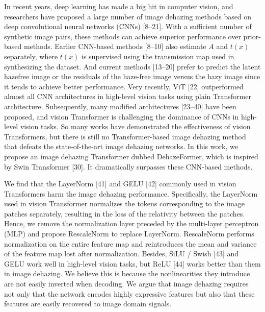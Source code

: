 In recent years, deep learning has made a big hit in computer vision, and researchers have proposed a large number of image dehazing methods based on deep convolutional neural networks (CNNs) [8–21]. With a sufficient number of synthetic image pairs, these methods can achieve superior performance over prior-based methods. Earlier CNN-based methods [8–10] also estimate $A$ and $t(x)$ separately, where $t(x)$ is supervised using the transmission map used in synthesizing the dataset. And current methods [13–20] prefer to predict the latent hazefree image or the residuals of the haze-free image versus the hazy image since it tends to achieve better performance. Very recently, ViT [22] outperformed almost all CNN architectures in high-level vision tasks using plain Transformer architecture. Subsequently, many modified architectures [23–40] have been proposed, and vision Transformer is challenging the dominance of CNNs in high-level vision tasks. So many works have demonstrated the effectiveness of vision Transformers, but there is still no Transformer-based image dehazing method that defeats the state-of-the-art image dehazing networks. In this work, we propose an image dehazing Transformer dubbed DehazeFormer, which is inspired by Swin Transformer [30]. It dramatically surpasses these CNN-based methods.

We find that the LayerNorm [41] and GELU [42] commonly used in vision Transformers harm the image dehazing performance. Specifically, the LayerNorm used in vision Transformer normalizes the tokens corresponding to the image patches separately, resulting in the loss of the relativity between the patches. Hence, we remove the normalization layer preceded by the multi-layer perceptron (MLP) and propose RescaleNorm to replace LayerNorm. RescaleNorm performs normalization on the entire feature map and reintroduces the mean and variance of the feature map lost after normalization. Besides, SiLU / Swish [43] and GELU work well in high-level vision tasks, but ReLU [44] works better than them in image dehazing. We believe this is because the nonlinearities they introduce are not easily inverted when decoding. We argue that image dehazing requires not only that the network encodes highly expressive features but also that these features are easily recovered to image domain signals.

